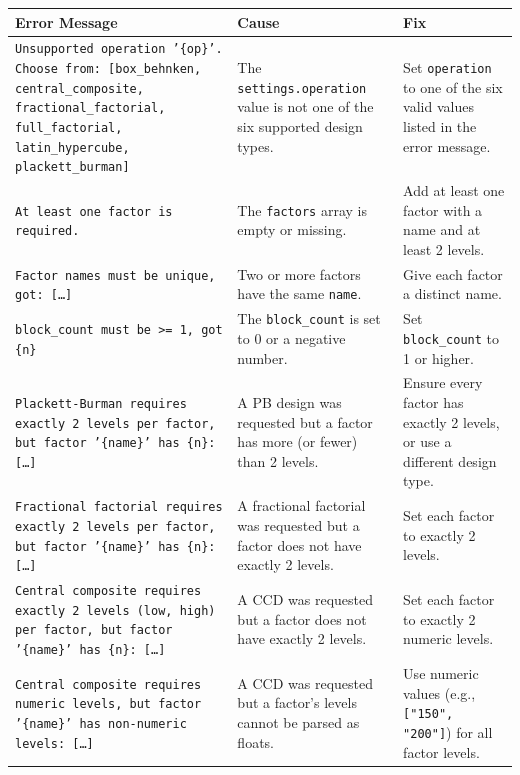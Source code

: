 \documentclass[11pt]{book}
\begin{document}
\begin{longtable}{@{}p{5.5cm}p{5.5cm}p{5.5cm}@{}}
\toprule
\textbf{Error Message} & \textbf{Cause} & \textbf{Fix} \\
\midrule
\endhead

\texttt{Unsupported operation '\{op\}'. Choose from: [box\_behnken, central\_composite, fractional\_factorial, full\_factorial, latin\_hypercube, plackett\_burman]} &
The \texttt{settings.operation} value is not one of the six supported design types. &
Set \texttt{operation} to one of the six valid values listed in the error message. \\
\midrule

\texttt{At least one factor is required.} &
The \texttt{factors} array is empty or missing. &
Add at least one factor with a name and at least 2 levels. \\
\midrule

\texttt{Factor names must be unique, got: [\ldots]} &
Two or more factors have the same \texttt{name}. &
Give each factor a distinct name. \\
\midrule

\texttt{block\_count must be >= 1, got \{n\}} &
The \texttt{block\_count} is set to 0 or a negative number. &
Set \texttt{block\_count} to 1 or higher. \\
\midrule

\texttt{Plackett-Burman requires exactly 2 levels per factor, but factor '\{name\}' has \{n\}: [\ldots]} &
A PB design was requested but a factor has more (or fewer) than 2 levels. &
Ensure every factor has exactly 2 levels, or use a different design type. \\
\midrule

\texttt{Fractional factorial requires exactly 2 levels per factor, but factor '\{name\}' has \{n\}: [\ldots]} &
A fractional factorial was requested but a factor does not have exactly 2 levels. &
Set each factor to exactly 2 levels. \\
\midrule

\texttt{Central composite requires exactly 2 levels (low, high) per factor, but factor '\{name\}' has \{n\}: [\ldots]} &
A CCD was requested but a factor does not have exactly 2 levels. &
Set each factor to exactly 2 numeric levels. \\
\midrule

\texttt{Central composite requires numeric levels, but factor '\{name\}' has non-numeric levels: [\ldots]} &
A CCD was requested but a factor's levels cannot be parsed as floats. &
Use numeric values (e.g., \texttt{["150", "200"]}) for all factor levels. \\
\midrule


\end{longtable}
\end{document}
